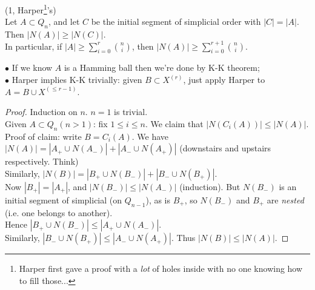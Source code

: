 \documentclass[a4paper]{article}
\begin{document}
\begin{thm} (1, Harper\footnote{Harper first gave a proof with a \emph{lot} of holes inside with no one knowing how to fill those...}'s)\\
    Let $A \subset Q_n$, and let $C$ be the initial segment of simplicial order with $|C| = |A|$. Then $|N(A)| \geq |N(C)|$.\\
    In particular, if $|A| \geq \sum_{i=0}^r {n \choose i}$, then $|N(A)| \geq \sum_{i=0}^{r+1} {n \choose i}$.

    \begin{rem}
        $\bullet$ If we know $A$ is a Hamming ball then we're done by K-K theorem;\\
        $\bullet$ Harper implies K-K trivially: given $B \subset X^{(r)}$, just apply Harper to $A=B \cup X^{(\leq r-1)}$.
    \end{rem}
    
    \begin{proof}
        Induction on $n$. $n=1$ is trivial.\\
        Given $A \subset Q_n(n>1)$: fix $1 \leq i \leq n$. We claim that $|N(C_i(A))| \leq |N(A)|$.\\
        Proof of claim: write $B = C_i(A)$. We have $|N(A)| = |A_+ \cup N(A_-)| + |A_- \cup N(A_+)|$ (downstairs and upstairs respectively. Think)\\
        Similarly, $|N(B)| = |B_+ \cup N(B_-)| + |B_- \cup N(B_+)|$.\\
        Now $|B_+| = |A_+|$, and $|N(B_-)| \leq |N(A_-)|$ (induction). But $N(B_-)$ is an initial segment of simplicial (on $Q_{n-1}$), as is $B_+$, so $N(B_-)$ and $B_+$ are \emph{nested} (i.e. one belongs to another).\\
        Hence $|B_+ \cup N(B_-)| \leq |A_+ \cup N(A_-)|$.\\
        Similarly, $|B_- \cup N(B_+)| \leq |A_- \cup N(A_+)|$. Thus $|N(B)| \leq |N(A)|$. 
    \end{proof}
\end{thm}
\end{document}
